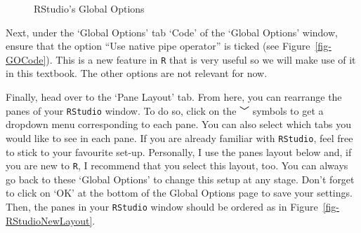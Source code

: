 \documentclass[
  letterpaper,
  DIV=11,
  numbers=noendperiod]{scrreprt}
\begin{document}
\begin{figure}
\begin{minipage}{0.50\linewidth}
{}


\end{minipage}%

\caption{\label{fig-GlobalOptions}RStudio's Global Options}

\end{figure}%

Next, under the `Global Options' tab `Code' of the `Global Options'
window, ensure that the option ``Use native pipe operator'' is ticked
(see Figure~\ref{fig-GOCode}). This is a new feature in \texttt{R} that
is very useful so we will make use of it in this textbook. The other
options are not relevant for now.

Finally, head over to the `Pane Layout' tab. From here, you can
rearrange the panes of your \texttt{RStudio} window. To do so, click on
the ﹀ symbols to get a dropdown menu corresponding to each pane. You
can also select which tabs you would like to see in each pane. If you
are already familiar with \texttt{RStudio}, feel free to stick to your
favourite set-up. Personally, I use the panes layout below and, if you
are new to \texttt{R}, I recommend that you select this layout, too. You
can always go back to these `Global Options' to change this setup at any
stage. Don't forget to click on `OK' at the bottom of the Global Options
page to save your settings. Then, the panes in your \texttt{RStudio}
window should be ordered as in Figure~\ref{fig-RStudioNewLayout}.
\end{document}
